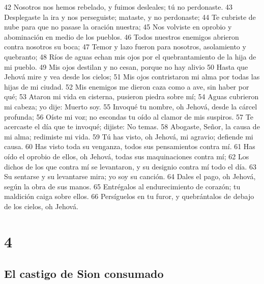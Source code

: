 42 Nosotros nos hemos rebelado, y fuimos desleales; tú no perdonaste.
43 Desplegaste la ira y nos perseguiste; mataste, y no perdonaste;
44 Te cubriste de nube para que no pasase la oración nuestra;
45 Nos volviste en oprobio y abominación en medio de los pueblos.
46 Todos nuestros enemigos abrieron contra nosotros su boca;
47 Temor y lazo fueron para nosotros, asolamiento y quebranto;
48 Ríos de aguas echan mis ojos por el quebrantamiento de la hija de mi pueblo.
49 Mis ojos destilan y no cesan, porque no hay alivio
50 Hasta que Jehová mire y vea desde los cielos;
51 Mis ojos contristaron mi alma por todas las hijas de mi ciudad.
52 Mis enemigos me dieron caza como a ave, sin haber por qué;
53 Ataron mi vida en cisterna, pusieron piedra sobre mí;
54 Aguas cubrieron mi cabeza; yo dije: Muerto soy.
55 Invoqué tu nombre, oh Jehová, desde la cárcel profunda;
56 Oíste mi voz; no escondas tu oído al clamor de mis suspiros.
57 Te acercaste el día que te invoqué; dijiste: No temas.
58 Abogaste, Señor, la causa de mi alma; redimiste mi vida.
59 Tú has visto, oh Jehová, mi agravio; defiende mi causa.
60 Has visto toda su venganza, todos sus pensamientos contra mí.
61 Has oído el oprobio de ellos, oh Jehová, todas sus maquinaciones contra mí;
62 Los dichos de los que contra mí se levantaron, y su designio contra mí todo el día.
63 Su sentarse y su levantarse mira; yo soy su canción.
64 Dales el pago, oh Jehová, según la obra de sus manos.
65 Entrégalos al endurecimiento de corazón; tu maldición caiga sobre ellos.
66 Persíguelos en tu furor, y quebrántalos de debajo de los cielos, oh Jehová. 

\chapter{4}

\section*{El castigo de Sion consumado}

